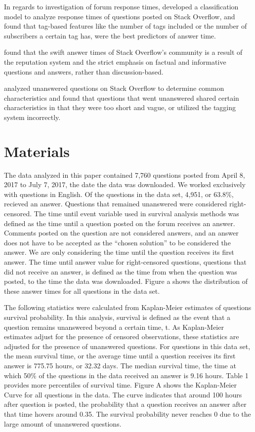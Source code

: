 \documentclass[12pt]{article}
\begin{document}
    In regards to investigation of forum response times, \citep{Bhat2014} developed a classification model to analyze response times of questions posted on Stack Overflow, and found that tag-based features like the number of tags included or the number of subscribers a certain tag has, were the best predictors of answer time. 

    \citep{Mamykina2011} found that the swift answer times of Stack Overflow's community is a result of the reputation system and the strict emphasis on factual and informative questions and answers, rather than discussion-based. 

    \citep{Asaduzzaman2013} analyzed unanswered questions on Stack Overflow to determine common characteristics and found that questions that went unanswered shared certain characteristics in that they were too short and vague, or utilized the tagging system incorrectly. 

\section{Materials}

    The data analyzed in this paper contained 7,760 questions posted from April 8, 2017 to July 7, 2017, the date the data was downloaded. We worked exclusively with questions in English. Of the questions in the data set, 4,951, or 63.8\%, recieved an answer. Questions that remained unanswered were considered right-censored. The time until event variable used in survival analysis methods was defined as the time until a question posted on the forum receives an answer. Comments posted on the question are not considered answers, and an answer does not have to be accepted as the ``chosen solution'' to be considered the answer. We are only considering the time until the question receives its first answer. The time until answer value for right-censored questions, questions that did not receive an answer, is defined as the time from when the question was posted, to the time the data was downloaded. Figure a shows the distribution of these answer times for all questions in the data set. 
    
    The following statistics were calculated from Kaplan-Meier estimates of questions survival probability. In this analysis, survival is defined as the event that a question remains unanswered beyond a certain time, t. As Kaplan-Meier estimates adjust for the presence of censored observations, these statistics are adjusted for the presence of unanswered questions. For questions in this data set, the mean survival time, or the average time until a question receives its first answer is 775.75 hours, or 32.32 days. The median survival time, the time at which 50\% of the questions in the data received an answer is 9.16 hours. Table 1 provides more percentiles of survival time. 
    Figure A shows the Kaplan-Meier Curve for all questions in the data. The curve indicates that around 100 hours after question is posted, the probability that a question receives an answer after that time hovers around 0.35. The survival probability never reaches 0 due to the large amount of unanswered questions. 
    
\end{document}
